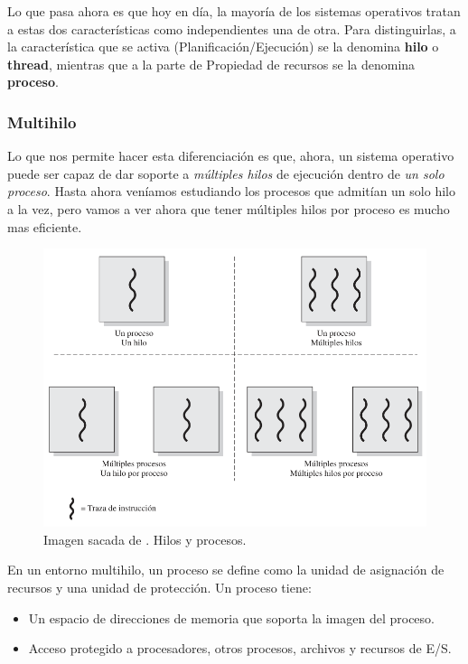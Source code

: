 \documentclass[12pt]{article}
\begin{document}
  Lo que pasa ahora es que hoy en día, la mayoría de los sistemas operativos tratan a estas dos características como independientes una de otra. Para distinguirlas, a la característica que se activa (Planificación/Ejecución) se la denomina \textbf{hilo} o \textbf{thread}, mientras que a la parte de Propiedad de recursos se la denomina \textbf{proceso}.

  \subsubsection{Multihilo}
  Lo que nos permite hacer esta diferenciación es que, ahora, un sistema operativo puede ser capaz de dar soporte a \textit{múltiples hilos} de ejecución dentro de \textit{un solo proceso}. Hasta ahora veníamos estudiando los procesos que admitían un solo hilo a la vez, pero vamos a ver ahora que tener múltiples hilos por proceso es mucho mas eficiente.

  \begin{figure}[H]
    \centering
    \includegraphics[width=0.9\linewidth]{imagenes/multihilos.png}
    \caption{Imagen sacada de \parencite{sostallings}. Hilos y procesos.}
    \label{fig:multihilos}
  \end{figure}

  En un entorno multihilo, un proceso se define como la unidad de asignación de recursos y una unidad de protección. Un proceso tiene:
  \begin{itemize}
    \item Un espacio de direcciones de memoria que soporta la imagen del proceso.

    \item Acceso protegido a procesadores, otros procesos, archivos y recursos de E/S.
  \end{itemize}
\end{document}
